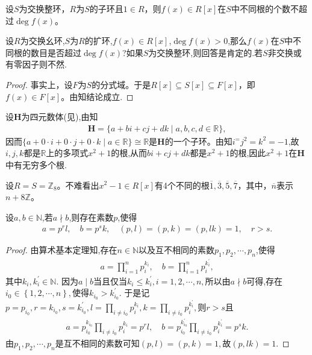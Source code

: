 \documentclass[../../main.tex]{subfiles}%
\begin{document}
\begin{proposition}\label{proposition:一元多项式的根不超过其次数}
设$S$为交换整环，$R$为$S$的子环且$1\in R$，则$f(x)\in R[x]$在$S$中不同根的个数不超过$\deg f(x)$。
\end{proposition}
\begin{remark}
设$R$为交换幺环,$S$为$R$的扩环,$f(x)\in R[x]$,$\deg f(x) > 0$,那么$f(x)$在$S$中不同根的数目是否超过$\deg f(x)$?如果$S$为交换整环,则回答是肯定的.若$S$非交换或有零因子则不然.
\end{remark}
\begin{proof}
事实上，设$F$为$S$的分式域。于是$R[x]\subseteq S[x]\subseteq F[x]$，即$f(x)\in F[x]$。由知结论成立.
\end{proof}

\begin{example}
设$\mathbf{H}$为四元数体(见),由知
\begin{align*}
\mathbf{H}=\{a+bi+cj+dk\mid a,b,c,d\in\mathbb{R}\},
\end{align*}
因而$\{a+0\cdot i+0\cdot j+0\cdot k\mid a\in\mathbb{R}\}\cong\mathbb{R}$是$\mathbf{H}$的一个子环。由知$i^=j^2=k^2=-1$,故$i,j,k$都是$\mathbb{R}$上的多项式$x^2+1$的根,从而$bi+cj+dk$都是$x^2+1$的根,因此$x^2+1$在$\mathbf{H}$中有无穷多个根.
\end{example}

\begin{example}
设$R=S=\mathbb{Z}_8$。不难看出$x^2-1\in R[x]$有4个不同的根$\overline{1},\overline{3},\overline{5},\overline{7}$，其中，$\overline{n}$表示$n+8\mathbb{Z}$。
\end{example}

\begin{proposition}\label{proposition:整除与不整除与素因子分解的相关定理}
设$a,b\in \mathbb{N}$,若$a\nmid b$,则存在素数$p$,使得
\begin{align*}
a=p^rl,\quad b=p^sk,\quad (p,l)=(p,k)=(p,lk)=1,\quad r>s.
\end{align*}
\end{proposition}
\begin{proof}
由算术基本定理知,存在$n\in \mathbb{N}$以及互不相同的素数$p_1,p_2,\cdots ,p_n$,使得
\begin{align*} a=\prod\limits_{i=1}^n{p_{i}^{k_i}},\quad b=\prod\limits_{i=1}^n{p_{i}^{k_{i}^{\prime}}}, \end{align*}
其中$k_i,k_{i}^{\prime}\in \mathbb{N}.$
因为$a\mid b$当且仅当$k_i\leqslant k_{i}^{\prime},i=1,2,\cdots ,n,$所以由$a\nmid b$可得,存在$i_0\in \left\{ 1,2,\cdots ,n \right\} ,$使得$k_{i_0}>k_{i_0}^{\prime}.$
于是记$p=p_{i_0},r=k_{i_0},s=k_{i_0}^{\prime},l=\prod\limits_{i\ne i_0}{p_{i}^{k_i}},k=\prod\limits_{i\ne i_0}{p_{i}^{k_{i}^{\prime}}},$则$r>s$且
\begin{align*} 
a=p_{i_0}^{k_{i_0}}\prod\limits_{i\ne i_0}{p_{i}^{k_i}}=p^rl,\quad b=p_{i_0}^{k_{i_0}^{\prime}}\prod\limits_{i\ne i_0}{p_{i}^{k_{i}^{\prime}}}=p^sk. 
\end{align*}
由$p_1,p_2,\cdots ,p_n$是互不相同的素数可知$(p,l)=(p,k)=1,$故$(p,lk)=1.$
\end{proof}
\end{document}
